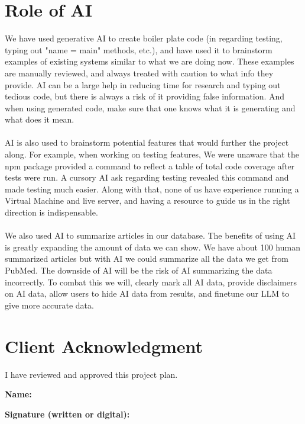 \documentclass{article}
\begin{document}
\section*{Role of AI}
We have used generative AI to create boiler plate code (in regarding testing, typing out "name = main" methods, etc.), and have used it to brainstorm examples of existing systems similar to what we are doing now. These examples are manually reviewed, and always treated with caution to what info they provide. AI can be a large help in reducing time for research and typing out tedious code, but there is always a risk of it providing false information. And when using generated code, make sure that one knows what it is generating and what does it mean. \\\\ 
AI is also used to brainstorm potential features that would further the project along. For example, when working on testing features, We were unaware that the npm package provided a command to reflect a table of total code coverage after tests were run. A cursory AI ask regarding testing revealed this command and made testing much easier. Along with that, none of us have experience running a Virtual Machine and live server, and having a resource to guide us in the right direction is indispensable.\\\\
We also used AI to summarize articles in our database. The benefits of using AI is greatly expanding the amount of data we can show. We have about 100 human summarized articles but with AI we could summarize all the data we get from PubMed. The downside of AI will be the risk of AI summarizing the data incorrectly. To combat this we will, clearly mark all AI data, provide disclaimers on AI data, allow users to hide AI data from results, and finetune our LLM to give more accurate data.

\section*{Client Acknowledgment}
I have reviewed and approved this project plan.  

\vspace{1em}
\noindent\textbf{Name:} \underline{\hspace{7cm}}  

\vspace{1em}
\noindent\textbf{Signature (written or digital):} \underline{\hspace{7cm}}  
\end{document}
